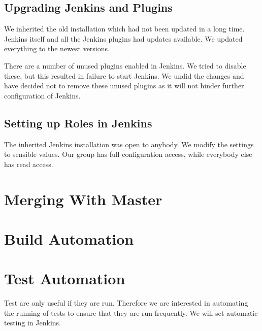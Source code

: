 \subsection{Upgrading Jenkins and Plugins}
We inherited the old installation which had not been updated in a long time. Jenkins itself and all the Jenkins plugins had updates available. We updated everything to the newest versions.

There are a number of unused plugins enabled in Jenkins. We tried to disable these, but this resulted in failure to start Jenkins. We undid the changes and have decided not to remove these unused plugins as it will not hinder further configuration of Jenkins.

\subsection{Setting up Roles in Jenkins}
The inherited Jenkins installation was open to anybody. We modify the settings to sensible values. Our group has full configuration access, while everybody else has read access.

\section{Merging With Master}\label{sec:branching_strategy}

\section{Build Automation}\label{sec:build_automation}

\section{Test Automation}\label{sec:test_automation}
Test are only useful if they are run. Therefore we are interested in automating the running of tests to ensure that they are run frequently. We will set automatic testing in Jenkins. 
